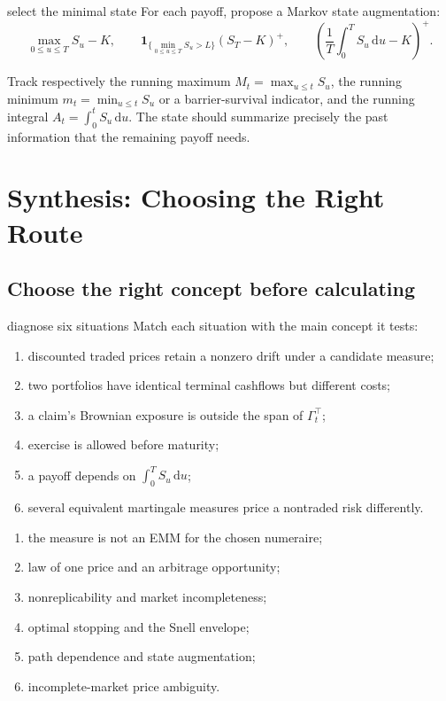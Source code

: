 \documentclass[10pt]{article}
\newcommand{\1}{\mathbf 1}
\newcommand{\dd}{\,\mathrm d}
\theoremstyle{definition}
\begin{document}
\begin{studentexercise}{select the minimal state}
For each payoff, propose a Markov state augmentation:
\[
\max_{0\leq u\leq T}S_u-K,\qquad
\1_{\{\min_{0\leq u\leq T}S_u>L\}}(S_T-K)^+,\qquad
\left(\frac1T\int_0^TS_u\dd u-K\right)^+.
\]
\end{studentexercise}
\begin{shortsolution}
Track respectively the running maximum
\(M_t=\max_{u\leq t}S_u\), the running minimum
\(m_t=\min_{u\leq t}S_u\) or a barrier-survival indicator, and the running
integral \(A_t=\int_0^tS_u\dd u\). The state should summarize precisely the
past information that the remaining payoff needs.
\end{shortsolution}

\section{Synthesis: Choosing the Right Route}

\subsection{Choose the right concept before calculating}

\begin{studentexercise}{diagnose six situations}
Match each situation with the main concept it tests:
\begin{enumerate}
  \item discounted traded prices retain a nonzero drift under a candidate
        measure;
  \item two portfolios have identical terminal cashflows but different costs;
  \item a claim's Brownian exposure is outside the span of \(\Gamma_t^\top\);
  \item exercise is allowed before maturity;
  \item a payoff depends on \(\int_0^TS_u\dd u\);
  \item several equivalent martingale measures price a nontraded risk
        differently.
\end{enumerate}
\end{studentexercise}
\begin{shortsolution}
\begin{enumerate}
  \item the measure is not an EMM for the chosen numeraire;
  \item law of one price and an arbitrage opportunity;
  \item nonreplicability and market incompleteness;
  \item optimal stopping and the Snell envelope;
  \item path dependence and state augmentation;
  \item incomplete-market price ambiguity.
\end{enumerate}
\end{shortsolution}
\end{document}
